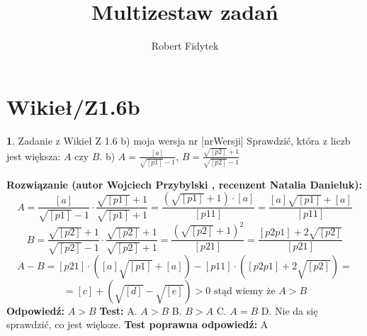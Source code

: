 \documentclass[12pt, a4paper]{article}
\title{Multizestaw zadań}
\author{Robert Fidytek}
\date{}
\theoremstyle{definition} %
\newtheorem{zad}{}
\newcommand{\kategoria}[1]{\section{#1}} %
\newcommand{\zadStart}[1]{\begin{zad}#1\newline} %
\newcommand{\zadStop}{\end{zad}}   %
\newcommand{\rozwStart}[2]{\noindent \textbf{Rozwiązanie (autor #1 , recenzent #2): }\newline} %
\newcommand{\rozwStop}{\newline}                                            %
\newcommand{\odpStart}{\noindent \textbf{Odpowiedź:}\newline}    %
\newcommand{\odpStop}{\newline}                                             %
\newcommand{\testStart}{\noindent \textbf{Test:}\newline} %
\newcommand{\testStop}{\newline} %
\newcommand{\kluczStart}{\noindent \textbf{Test poprawna odpowiedź:}\newline} %
\newcommand{\kluczStop}{\newline} %
\begin{document}
\maketitle


\kategoria{Wikieł/Z1.6b}
\zadStart{Zadanie z Wikieł Z 1.6 b) moja wersja nr [nrWersji]}
Sprawdzić, która z liczb jest większa: $A$ czy $B$.
b) $A=\frac{[a]}{\sqrt{[p1]}-1}$, $B=\frac{\sqrt{[p2]}+1}{\sqrt{[p2]}-1}$
\zadStop
\rozwStart{Wojciech Przybylski}{Natalia Danieluk}
$$A=\frac{[a]}{\sqrt{[p1]}-1}\cdot \frac{\sqrt{[p1]}+1}{\sqrt{[p1]}+1}=\frac{(\sqrt{[p1]}+1)\cdot [a]}{[p11]}=\frac{[a]\sqrt{[p1]}+[a]}{[p11]}$$
$$B=\frac{\sqrt{[p2]}+1}{\sqrt{[p2]}-1}\cdot \frac{\sqrt{[p2]}+1}{\sqrt{[p2]}+1}=\frac{(\sqrt{[p2]}+1)^{2}}{[p21]}=\frac{[p2p1]+2\sqrt{[p2]}}{[p21]}$$
$$A-B=[p21]\cdot([a]\sqrt{[p1]}+[a])-[p11]\cdot([p2p1]+2\sqrt{[p2]})=$$
$$=[c]+(\sqrt{[d]}-\sqrt{[e]})>0 \mbox{ stąd wiemy że }A>B$$
\rozwStop
\odpStart
$A>B$
\odpStop
\testStart
A. $A>B$
B. $B>A$
C. $A=B$
D. Nie da się sprawdzić, co jest większe.
\testStop
\kluczStart
A
\kluczStop
\end{document}
